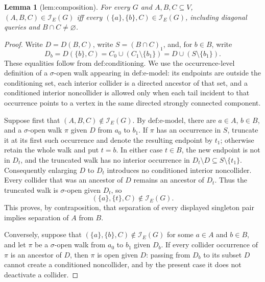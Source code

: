 \documentclass{article}
\newtheorem{lemma}{Lemma}
\begin{document}
\begin{lemma}[lem:composition]\label{lem:composition}
For every \(G\) and \(A,B,C\subseteq V\), \((A,B,C)\in\mathcal I_E(G)\) iff every \((\{a\},\{b\},C)\in\mathcal I_E(G)\), including diagonal queries and \(B\cap C\neq\varnothing\).
\end{lemma}
\begin{proof}
Write \(D=D(B,C)\), write \(S=(B\cap C)_1\), and, for \(b\in B\), write
\[
D_b=D(\{b\},C)=C_0\cup(C_1\setminus\{b_1\})
     =D\cup(S\setminus\{b_1\}).
\]
These equalities follow from \(\text{def:conditioning}\).  We use the occurrence-level definition of a \(\sigma\)-open walk appearing in \(\text{def:e-model}\): its endpoints are outside the conditioning set, each interior collider is a directed ancestor of that set, and a conditioned interior noncollider is allowed only when each tail incident to that occurrence points to a vertex in the same directed strongly connected component.

Suppose first that \((A,B,C)\notin\mathcal I_E(G)\).  By \(\text{def:e-model}\), there are \(a\in A\), \(b\in B\), and a \(\sigma\)-open walk \(\pi\) given \(D\) from \(a_0\) to \(b_1\).  If \(\pi\) has an occurrence in \(S\), truncate it at its first such occurrence and denote the resulting endpoint by \(t_1\); otherwise retain the whole walk and put \(t=b\).  In either case \(t\in B\), the new endpoint is not in \(D_t\), and the truncated walk has no interior occurrence in \(D_t\setminus D\subseteq S\setminus\{t_1\}\).  Consequently enlarging \(D\) to \(D_t\) introduces no conditioned interior noncollider.  Every collider that was an ancestor of \(D\) remains an ancestor of \(D_t\).  Thus the truncated walk is \(\sigma\)-open given \(D_t\), so
\[
(\{a\},\{t\},C)\notin\mathcal I_E(G).
\]
This proves, by contraposition, that separation of every displayed singleton pair implies separation of \(A\) from \(B\).

Conversely, suppose that \((\{a\},\{b\},C)\notin\mathcal I_E(G)\) for some \(a\in A\) and \(b\in B\), and let \(\pi\) be a \(\sigma\)-open walk from \(a_0\) to \(b_1\) given \(D_b\).  If every collider occurrence of \(\pi\) is an ancestor of \(D\), then \(\pi\) is open given \(D\): passing from \(D_b\) to its subset \(D\) cannot create a conditioned noncollider, and by the present case it does not deactivate a collider.


\end{proof}
\end{document}
